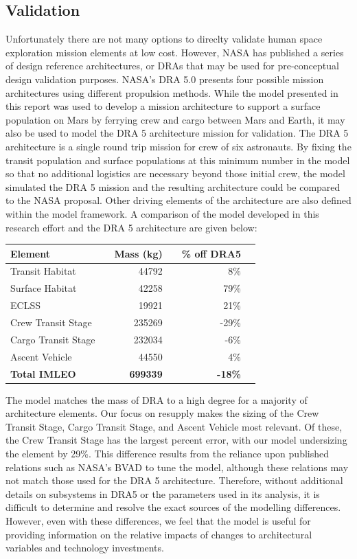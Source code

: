 \documentclass[]{aiaa-pretty}
\begin{document}
\subsection{Validation}
Unfortunately there are not many options to direclty validate human space exploration mission elements at low cost. However, NASA has published a series of design reference architectures, or DRAs that may be used for pre-conceptual design validation purposes. NASA's DRA 5.0 presents four possible mission architectures using different propulsion methods. While the model presented in this report was used to develop a mission architecture to support a surface population on Mars by ferrying crew and cargo between Mars and Earth, it may also be used to model the DRA 5 architecture mission for validation. The DRA 5 architecture is a single round trip mission for crew of six astronauts. By fixing the transit population and surface populations at this minimum number in the model so that no additional logistics are necessary beyond those initial crew, the model simulated the DRA 5 mission and the resulting architecture could be compared to the NASA proposal.\cite{drake2010human} Other driving elements of the architecture are also defined within the model framework. A comparison of the model developed in this research effort and the DRA 5 architecture are given below:

\begin{center}
	\begin{tabular}{ lc rc rc}
		\textbf{Element} && \textbf{Mass (kg)} && \textbf{\% off DRA5} \\\hline
		Transit Habitat && 44792 && 8\% \\
		Surface Habitat && 42258 && 79\% \\
		ECLSS && 19921 && 21\% \\
		Crew Transit Stage && 235269 && -29\% \\
		Cargo Transit Stage && 232034 && -6\% \\
		Ascent Vehicle && 44550 && 4\% \\
		\textbf{Total IMLEO} && \textbf{699339} && \textbf{-18\%} \\
	\end{tabular}
\end{center}
The model matches the mass of DRA to a high degree for a majority of architecture elements. Our focus on resupply makes the sizing of the Crew Transit Stage, Cargo Transit Stage, and Ascent Vehicle most relevant. Of these, the Crew Transit Stage has the largest percent error, with our model undersizing the element by 29\%. This difference results from the reliance upon published relations such as NASA's BVAD to tune the model, although these relations may not match those used for the DRA 5 architecture. Therefore, without additional details on subsystems in DRA5 or the parameters used in its analysis, it is difficult to determine and resolve the exact sources of the modelling differences. However, even with these differences, we feel that the model is useful for providing information on the relative impacts of changes to architectural variables and technology investments. 
\end{document}
